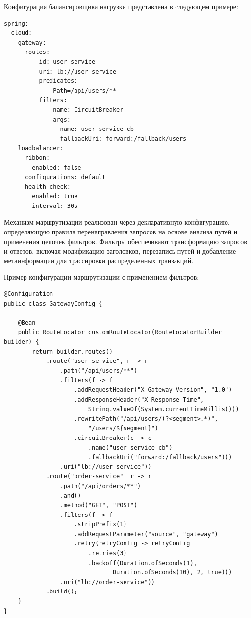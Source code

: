 Конфигурация балансировщика нагрузки представлена в следующем примере:

\begin{lstlisting}
spring:
  cloud:
    gateway:
      routes:
        - id: user-service
          uri: lb://user-service
          predicates:
            - Path=/api/users/**
          filters:
            - name: CircuitBreaker
              args:
                name: user-service-cb
                fallbackUri: forward:/fallback/users
    loadbalancer:
      ribbon:
        enabled: false
      configurations: default
      health-check:
        enabled: true
        interval: 30s
\end{lstlisting}

Механизм маршрутизации реализован через декларативную конфигурацию, определяющую правила перенаправления запросов на основе анализа путей и применения цепочек фильтров. Фильтры обеспечивают трансформацию запросов и ответов, включая модификацию заголовков, перезапись путей и добавление метаинформации для трассировки распределенных транзакций.

Пример конфигурации маршрутизации с применением фильтров:

\begin{lstlisting}
@Configuration
public class GatewayConfig {

    @Bean
    public RouteLocator customRouteLocator(RouteLocatorBuilder builder) {
        return builder.routes()
            .route("user-service", r -> r
                .path("/api/users/**")
                .filters(f -> f
                    .addRequestHeader("X-Gateway-Version", "1.0")
                    .addResponseHeader("X-Response-Time",
                        String.valueOf(System.currentTimeMillis()))
                    .rewritePath("/api/users/(?<segment>.*)",
                        "/users/${segment}")
                    .circuitBreaker(c -> c
                        .name("user-service-cb")
                        .fallbackUri("forward:/fallback/users")))
                .uri("lb://user-service"))
            .route("order-service", r -> r
                .path("/api/orders/**")
                .and()
                .method("GET", "POST")
                .filters(f -> f
                    .stripPrefix(1)
                    .addRequestParameter("source", "gateway")
                    .retry(retryConfig -> retryConfig
                        .retries(3)
                        .backoff(Duration.ofSeconds(1),
                               Duration.ofSeconds(10), 2, true)))
                .uri("lb://order-service"))
            .build();
    }
}
\end{lstlisting}

